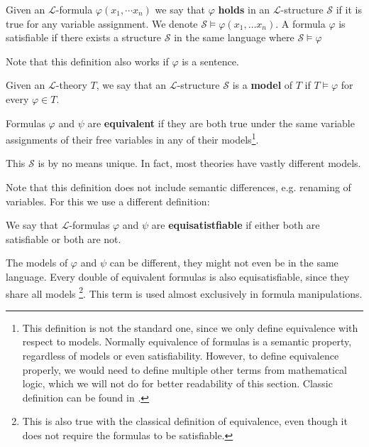\begin{defn}
Given an $\mathcal{L}$-formula $\varphi(x_1,\cdots x_n)$ we say that $\varphi$ \textbf{holds} in an $\mathcal{L}$-structure $\mathcal{S}$ if it is true for any variable assignment. We denote $\mathcal{S}\models \varphi(x_1,\dots x_n)$. A formula $\varphi$ is satisfiable if there exists a structure $\mathcal{S}$ in the same language where $\mathcal{S}\models \varphi$
\end{defn}
Note that this definition also works if $\varphi$ is a sentence.

\begin{defn}
Given an $\mathcal{L}$-theory $T$, we say that an $\mathcal{L}$-structure $\mathcal{S}$ is a \textbf{model} of $T$ if $T\models \varphi$ for every $\varphi\in T$.
\end{defn}

\begin{defn}
Formulas $\varphi$ and $\psi$ are \textbf{equivalent} if they are both true under the same variable assignments of their free variables in any of their models\footnote{This definition is not the standard one, since we only define equivalence with respect to models. Normally equivalence of formulas is a semantic property, regardless of models or even satisfiability. However, to define equivalence properly, we would need to define multiple other terms from mathematical logic, which we will not do for better readability of this section. Classic definition can be found in \cite{logic}.}.
\end{defn}
This $\mathcal{S}$ is by no means unique. In fact, most theories have vastly different models.

Note that this definition does not include semantic differences, e.g. renaming of variables. For this we use a different definition:

\begin{defn}
	We say that $\mathcal{L}$-formulas $\varphi$ and $\psi$ are \textbf{equisatistfiable} if either both are satisfiable or both are not.
\end{defn}

The models of $\varphi$ and $\psi$ can be different, they might not even be in the same language. Every double of equivalent formulas is also equisatisfiable, since they share all models \footnote{This is also true with the classical definition of equivalence, even though it does not require the formulas to be satisfiable.}. This term is used almost exclusively in formula manipulations.

